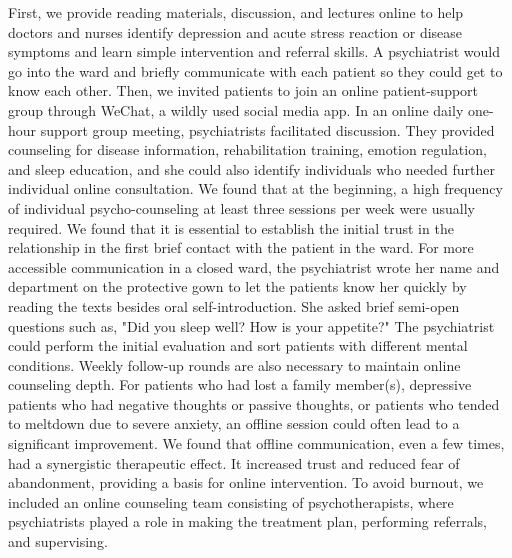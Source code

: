 \documentclass[
]{article}
\begin{document}
First, we provide reading materials, discussion, and lectures online to help doctors and nurses identify depression and acute stress reaction or disease symptoms and learn simple intervention and referral skills. A psychiatrist would go into the ward and briefly communicate with each patient so they could get to know each other. Then, we invited patients to join an online patient-support group through WeChat, a wildly used social media app. In an online daily one-hour support group meeting, psychiatrists facilitated discussion. They provided counseling for disease information, rehabilitation training, emotion regulation, and sleep education, and she could also identify individuals who needed further individual online consultation. We found that at the beginning, a high frequency of individual psycho-counseling at least three sessions per week were usually required. We found that it is essential to establish the initial trust in the relationship in the first brief contact with the patient in the ward. For more accessible communication in a closed ward, the psychiatrist wrote her name and department on the protective gown to let the patients know her quickly by reading the texts besides oral self-introduction. She asked brief semi-open questions such as, "Did you sleep well? How is your appetite?" The psychiatrist could perform the initial evaluation and sort patients with different mental conditions. Weekly follow-up rounds are also necessary to maintain online counseling depth. For patients who had lost a family member(s), depressive patients who had negative thoughts or passive thoughts, or patients who tended to meltdown due to severe anxiety, an offline session could often lead to a significant improvement. We found that offline communication, even a few times, had a synergistic therapeutic effect. It increased trust and reduced fear of abandonment, providing a basis for online intervention. To avoid burnout, we included an online counseling team consisting of psychotherapists, where psychiatrists played a role in making the treatment plan, performing referrals, and supervising.
\end{document}
